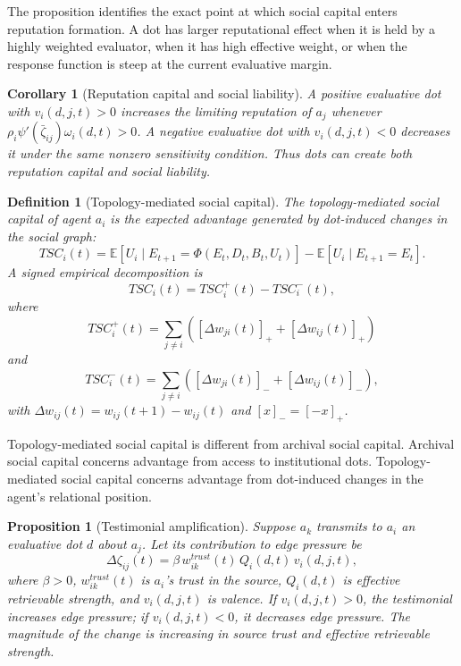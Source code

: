 \documentclass[11pt]{article}
\newtheorem{definition}{Definition}
\newtheorem{proposition}{Proposition}
\newtheorem{corollary}{Corollary}
\theoremstyle{remark}
\begin{document}
The proposition identifies the exact point at which social capital enters
reputation formation. A dot has larger reputational effect when it is
held by a highly weighted evaluator, when it has high effective weight,
or when the response function is steep at the current evaluative margin.

\begin{corollary}[Reputation capital and social liability]\label{cor:reputation-capital-liability}
A positive evaluative dot with $v_i(d,j,t)>0$ increases the limiting
reputation of $a_j$ whenever
$\rho_i\psi'(\bar{\zeta}_{ij})\omega_i(d,t)>0$. A negative evaluative dot with
$v_i(d,j,t)<0$ decreases it under the same nonzero sensitivity condition.
Thus dots can create both reputation capital and social liability.
\end{corollary}


\begin{definition}[Topology-mediated social capital]\label{def:topology-mediated-social-capital}
The topology-mediated social capital of agent $a_i$ is the expected
advantage generated by dot-induced changes in the social graph:
$$
TSC_i(t)=
\mathbb E[U_i\mid E_{t+1}=\Phi(E_t,D_t,B_t,U_t)]
-
\mathbb E[U_i\mid E_{t+1}=E_t].
$$
A signed empirical decomposition is
$$
TSC_i(t)=TSC_i^+(t)-TSC_i^-(t),
$$
where
$$
TSC_i^+(t)=\sum_{j\neq i}\left([\Delta w_{ji}(t)]_+ + [\Delta w_{ij}(t)]_+\right)
$$
and
$$
TSC_i^-(t)=\sum_{j\neq i}\left([\Delta w_{ji}(t)]_- + [\Delta w_{ij}(t)]_-\right),
$$
with $\Delta w_{ij}(t)=w_{ij}(t+1)-w_{ij}(t)$ and
$[x]_-=[-x]_+$.
\end{definition}

Topology-mediated social capital is different from archival social
capital. Archival social capital concerns advantage from access to
institutional dots. Topology-mediated social capital concerns advantage
from dot-induced changes in the agent's relational position.

\begin{proposition}[Testimonial amplification]\label{prop:testimonial-amplification}
Suppose $a_k$ transmits to $a_i$ an evaluative dot $d$ about $a_j$. Let
its contribution to edge pressure be
$$
\Delta \zeta_{ij}(t)=\beta\,w_{ik}^{trust}(t)\,Q_i(d,t)\,v_i(d,j,t),
$$
where $\beta>0$, $w_{ik}^{trust}(t)$ is $a_i$'s trust in the source,
$Q_i(d,t)$ is effective retrievable strength, and $v_i(d,j,t)$ is
valence. If $v_i(d,j,t)>0$, the testimonial increases edge pressure; if
$v_i(d,j,t)<0$, it decreases edge pressure. The magnitude of the change
is increasing in source trust and effective retrievable strength.
\end{proposition}
\end{document}
